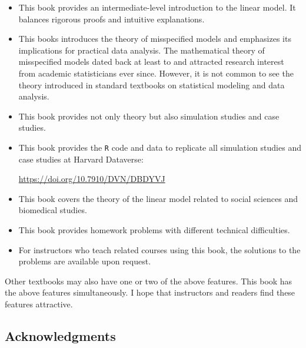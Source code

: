 \begin{itemize}
\item
This book provides an intermediate-level introduction to the linear model. It balances rigorous proofs and intuitive explanations. 


\item
This books introduces the theory of misspecified models and emphasizes its implications for practical data analysis. The mathematical theory of misspecified models dated back at least to \citet{huber::1967} and attracted research interest from academic statisticians ever since. However, it is not common to see the theory introduced in standard textbooks on statistical modeling and data analysis. 
 

\item
This book provides not only theory but also simulation studies and case studies.

\item
This book provides the \texttt{R} code and data to replicate all simulation studies and case studies at Harvard Dataverse:
\begin{center}
\href{https://doi.org/10.7910/DVN/DBDYVJ}{https://doi.org/10.7910/DVN/DBDYVJ}
\end{center}

\item
This book covers the theory of the linear model related to social sciences and biomedical studies. 

\item
This book provides homework problems with different technical difficulties. 

\item
For instructors who teach related courses using this book,  the solutions to the problems are available upon request. 
\end{itemize}




Other textbooks may also have one or two of the above features. This book has the above features simultaneously. I hope that instructors and readers find these features attractive.  
 
 
 




\subsection*{Acknowledgments}



